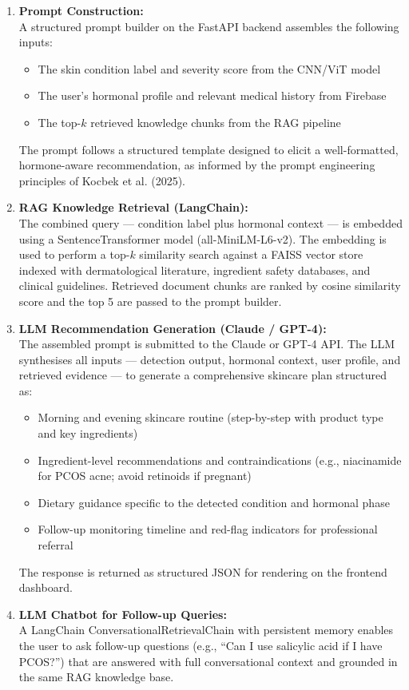 \begin{enumerate}
    \item \textbf{Prompt Construction:}\\
    A structured prompt builder on the FastAPI backend assembles the following inputs:
    \begin{itemize}
        \item The skin condition label and severity score from the CNN/ViT model
        \item The user's hormonal profile and relevant medical history from Firebase
        \item The top-$k$ retrieved knowledge chunks from the RAG pipeline
    \end{itemize}
    The prompt follows a structured template designed to elicit a well-formatted, hormone-aware recommendation, as informed by the prompt engineering principles of Kocbek et al. (2025).

    \item \textbf{RAG Knowledge Retrieval (LangChain):}\\
    The combined query — condition label plus hormonal context — is embedded using a SentenceTransformer model (all-MiniLM-L6-v2). The embedding is used to perform a top-$k$ similarity search against a FAISS vector store indexed with dermatological literature, ingredient safety databases, and clinical guidelines. Retrieved document chunks are ranked by cosine similarity score and the top 5 are passed to the prompt builder.

    \item \textbf{LLM Recommendation Generation (Claude / GPT-4):}\\
    The assembled prompt is submitted to the Claude or GPT-4 API. The LLM synthesises all inputs — detection output, hormonal context, user profile, and retrieved evidence — to generate a comprehensive skincare plan structured as:
    \begin{itemize}[label=$\diamond$]
        \item Morning and evening skincare routine (step-by-step with product type and key ingredients)
        \item Ingredient-level recommendations and contraindications (e.g., niacinamide for PCOS acne; avoid retinoids if pregnant)
        \item Dietary guidance specific to the detected condition and hormonal phase
        \item Follow-up monitoring timeline and red-flag indicators for professional referral
    \end{itemize}
    The response is returned as structured JSON for rendering on the frontend dashboard.

    \item \textbf{LLM Chatbot for Follow-up Queries:}\\
    A LangChain ConversationalRetrievalChain with persistent memory enables the user to ask follow-up questions (e.g., ``Can I use salicylic acid if I have PCOS?'') that are answered with full conversational context and grounded in the same RAG knowledge base.
\end{enumerate}

